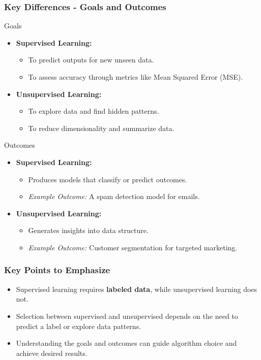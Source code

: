 \documentclass[aspectratio=169]{beamer}
\begin{document}
\begin{frame}[fragile]
    \frametitle{Key Differences - Goals and Outcomes}
    \begin{block}{Goals}
        \begin{itemize}
            \item \textbf{Supervised Learning:} 
            \begin{itemize}
                \item To predict outputs for new unseen data.
                \item To assess accuracy through metrics like Mean Squared Error (MSE).
            \end{itemize}
            \item \textbf{Unsupervised Learning:} 
            \begin{itemize}
                \item To explore data and find hidden patterns.
                \item To reduce dimensionality and summarize data.
            \end{itemize}
        \end{itemize}
    \end{block}

    \begin{block}{Outcomes}
        \begin{itemize}
            \item \textbf{Supervised Learning:} 
            \begin{itemize}
                \item Produces models that classify or predict outcomes.
                \item \textit{Example Outcome:} A spam detection model for emails.
            \end{itemize}
            \item \textbf{Unsupervised Learning:} 
            \begin{itemize}
                \item Generates insights into data structure.
                \item \textit{Example Outcome:} Customer segmentation for targeted marketing.
            \end{itemize}
        \end{itemize}
    \end{block}
\end{frame}

\begin{frame}[fragile]
    \frametitle{Key Points to Emphasize}
    \begin{itemize}
        \item Supervised learning requires \textbf{labeled data}, while unsupervised learning does not.
        \item Selection between supervised and unsupervised depends on the need to predict a label or explore data patterns.
        \item Understanding the goals and outcomes can guide algorithm choice and achieve desired results.
    \end{itemize}
\end{frame}
\end{document}
